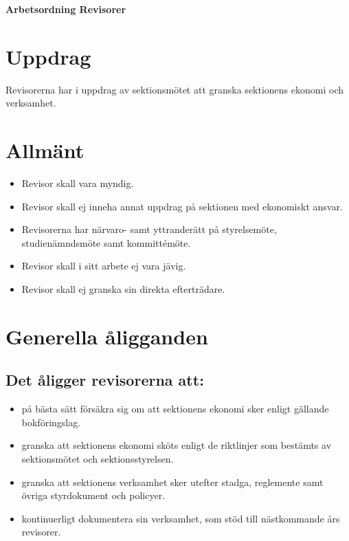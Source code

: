 

\renewcommand{\dateseparator}{-} %

\renewcommand{\forening}{Revisorer}

\begin{center}
\LARGE{\textbf{Arbetsordning Revisorer}}
\end{center}


\section{Uppdrag}
Revisorerna har i uppdrag av sektionsmötet att granska sektionens ekonomi och verksamhet.

\section{Allmänt}
\begin{itemize}
\item Revisor skall vara myndig.
\item Revisor skall ej inneha annat uppdrag på sektionen med ekonomiskt ansvar.
\item Revisorerna har närvaro- samt yttranderätt på styrelsemöte, studienämndsmöte samt kommittémöte.
\item Revisor skall i sitt arbete ej vara jävig.
\item Revisor skall ej granska sin direkta efterträdare.
\end{itemize}

\section{Generella åligganden}

\subsection{Det åligger revisorerna att:}
\begin{itemize}
\item på bästa sätt försäkra sig om att sektionens ekonomi sker enligt gällande bokföringslag.

\item granska att sektionens ekonomi sköts enligt de riktlinjer som bestämts av sektionsmötet och sektionsstyrelsen.

\item granska att sektionens verksamhet sker utefter stadga, reglemente samt övriga styrdokument och policyer.

\item kontinuerligt dokumentera sin verksamhet, som stöd till nästkommande års revisorer.

\end{itemize}

